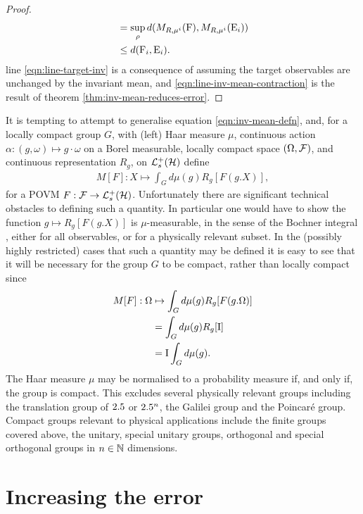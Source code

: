 \begin{thm}
\begin{proof}
\begin{align}
      \label{eqn:line-target-inv}
                                           &= \sup_\rho d(M_{R, \mu^i}(\operatorname{F}),  M_{R, \mu^i}(\operatorname{E}_i))\\
      \label{eqn:line-inv-mean-contraction}
                                           &\leq d(\operatorname{F}_i, \operatorname{E}_i).
    \end{align}
    line \eqref{eqn:line-target-inv} is a consequence of assuming the target observables are unchanged by the invariant mean, and \eqref{eqn:line-inv-mean-contraction} is the result of theorem \ref{thm:inv-mean-reduces-error}.
  \end{proof}
\end{thm}

It is tempting to attempt to generalise equation \ref{eqn:inv-mean-defn}, and, for a locally compact group $G$, with (left) Haar measure $\mu$, continuous action $\alpha: (g,\omega)\mapsto g\cdot\omega$ on a Borel measurable, locally compact space $(\Omega, \mathcal{F})$, and continuous representation $R_g$, on $\posops[\hcal]$ define
\begin{align}
  M[F]: X\mapsto\int_G d\mu(g) R_g[F(g.X)],
\end{align}
for a POVM $F:\fcal\to\posops[\hcal]$. Unfortunately there are significant technical obstacles to defining such a quantity. In particular one would have to show the function $g\mapsto R_g[F(g.X)]$ is $\mu$-measurable, in the sense of the Bochner integral , either for all observables, or for a physically relevant subset. In the (possibly highly restricted) cases that such a quantity may be defined it is easy to see that it will be necessary for the group $G$ to be compact, rather than locally compact since
\begin{align}
  M[F]:\Omega&\mapsto\int_G d\mu(g) R_g[F(g.\Omega)]\\
             &=\int_G d\mu(g) R_g[\operatorname{I}]\\
             &=\operatorname{I}\int_G d\mu(g).\label{eqn:inv-mean-identity-infinite-case}
\end{align}
The Haar measure $\mu$ may be normalised to a probability measure if, and only if, the group is compact. This excludes several physically relevant groups including the translation group of $2.5$ or $2.5^n$, the Galilei group and the Poincar{\'e} group. Compact groups relevant to physical applications include the finite groups covered above, the unitary, special unitary groups, orthogonal and special orthogonal groups in $n\in\mathbb{N}$ dimensions.

\section{Increasing the error}
\label{sec:inc-error}

